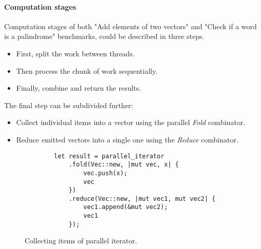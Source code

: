 \paragraph*{Computation stages}
Computation stages of both "Add elements of two vectors" and "Check if a word is a palindrome" benchmarks, could be described in three steps. 
\begin{itemize}
    \item First, split the work between threads. 
    \item Then process the chunk of work sequentially. 
    \item Finally, combine and return the results.    
\end{itemize}

The final step can be subdivided further:
\begin{itemize}
    \item Collect individual items into a vector using the parallel \emph{Fold} combinator. 
    \item Reduce emitted vectors into a single one using the \emph{Reduce} combinator. 
\end{itemize}


\begin{figure}[!htbp]
    \centering

    \begin{verbatim}
        let result = parallel_iterator
            .fold(Vec::new, |mut vec, x| {
                vec.push(x);
                vec
            })
            .reduce(Vec::new, |mut vec1, mut vec2| {
                vec1.append(&mut vec2);
                vec1
            });
    \end{verbatim}
    
    \caption{Collecting items of parallel iterator.}
    \label{fig:fold-reduce}
\end{figure}






